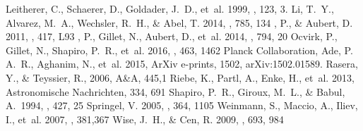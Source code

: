 \documentclass[twocolumn]{aastex61}
\begin{document}
\begin{thebibliography}{}
 Leitherer, C., Schaerer, D., Goldader, J.~D., {et~al.} 1999, \apjs, 123, 3.
 {Li}, T.~Y., {Alvarez}, M.~A., {Wechsler}, R.~H., \& {Abel}, T. 2014, \apj, 785, 134
, P., \& {Aubert}, D. 2011, \mnras, 417, L93
, P., {Gillet}, N., {Aubert}, D., {et~al.} 2014, \apj, 794, 20
 {Ocvirk}, P., {Gillet}, N., {Shapiro}, P.~R., {et~al.} 2016, \mnras, 463, 1462
 {Planck Collaboration}, Ade, P. A.~R., Aghanim, N., {et~al.} 2015, ArXiv e-prints, 1502, arXiv:1502.01589.
 {Rasera}, Y., \& {Teyssier}, R., 2006, A\&A, 445,1
 {Riebe}, K., {Partl}, A., {Enke}, H., {et~al.} 2013, Astronomische Nachrichten, 334, 691
 Shapiro, P.~R., Giroux, M.~L., \& Babul, A.\ 1994, \apj, 427, 25 
 {Springel}, V. 2005, \mnras, 364, 1105
 {Weinmann}, S., {Maccio}, A., {Iliev}, I., {et~al.} 2007, \mnras, 381,367
 {Wise}, J.~H., \& {Cen}, R. 2009, \apj, 693, 984


\end{thebibliography}


\end{document}
